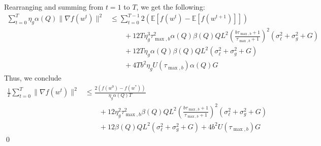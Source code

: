\documentclass{article}
\begin{document}
Rearranging and summing from $t=1$ to $T$, we get the following:
\begin{align*}
    \sum_{t=0}^{T}{\eta_g \alpha(Q) \| \nabla f(w^t) \|^2}
    &\leq
    \sum_{t=0}^{T-1} 2\left(
        \mathbb{E}[f(w^t) - \mathbb{E}[f(w^{t+1})]]
    \right)
    \\
    &\qquad + 
    12 T \eta_g^3 \tau_{\max, b}^2  \alpha(Q) \beta(Q) Q  L^2 
    \left( \frac{b\tau_{\max, b} + 1}{\tau_{\max, b} + 1}\right)^2
    \left(\sigma_\ell^2 + \sigma^2_g + G \right)
    \\
    &\qquad +
    12 T \eta_g \alpha(Q) \beta(Q)  Q L^2 ( \sigma_\ell^2 + \sigma_g^2 + G) 
    \\
    &\qquad 
    +
    4 T b^2 \eta_g  U(\tau_{\max, b}) \alpha(Q) G
\end{align*}
Thus, we conclude
\begin{align*}
    \frac{1}{T}\sum_{t=0}^{T}{ \| \nabla f(w^t) \|^2}
    &\leq
    \frac{2 (f(w^0) - f(w^*))}{\eta_g \alpha(Q) T}
    \\
    &\qquad + 
    12 \eta_g^2 \tau_{\max, b}^2  \beta(Q) Q  L^2 
    \left( \frac{b\tau_{\max, b} + 1}{\tau_{\max, b} + 1}\right)^2
    \left(\sigma_\ell^2 + \sigma^2_g + G \right)
    \\
    &\qquad +
    12 \beta(Q)  Q L^2 ( \sigma_\ell^2 + \sigma_g^2 + G) 
    +
    4 b^2 U(\tau_{\max, b})G
\end{align*}
\qed
\end{document}
